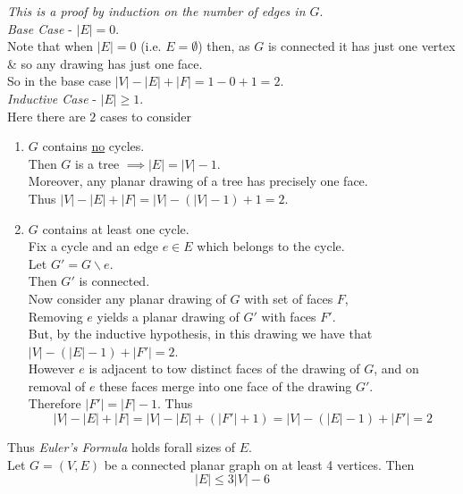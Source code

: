 \documentclass[11pt,a4paper]{article}
\begin{document}
\textit{This is a proof by induction on the number of edges in $G$}.\\
\textit{Base Case} - $|E|=0$.\\
Note that when $|E|=0$ (i.e. $E=\emptyset$) then, as $G$ is connected it has just one vertex \& so any drawing has just one face.\\
So in the base case $|V|-|E|+|F|=1-0+1=2$.\\
\textit{Inductive Case} - $|E|\geq1$.\\
Here there are $2$ cases to consider
\begin{enumerate}[label=\roman*)]
	\item $G$ contains \underline{no} cycles.\\
	Then $G$ is a tree $\implies|E|=|V|-1$.\\
	Moreover, any planar drawing of a tree has precisely one face.\\
	Thus $|V|-|E|+|F|=|V|-(|V|-1)+1=2$.
	\item $G$ contains at least one cycle.\\
	Fix a cycle and an edge $e\in E$ which belongs to the cycle.\\
	Let $G'=G\backslash e$.\\
	Then $G'$ is connected.\\
	Now consider any planar drawing of $G$ with set of faces $F$,\\
	Removing $e$ yields a planar drawing of $G'$ with faces $F'$.\\
	But, by the inductive hypothesis, in this drawing we have that $|V|-(|E|-1)+|F'|=2$.\\
	However $e$ is adjacent to tow distinct faces of the drawing of $G$, and on removal of $e$ these faces merge into one face of the drawing $G'$.\\
	Therefore $|F'|=|F|-1$. Thus
	$$|V|-|E|+|F|=|V|-|E|+(|F'|+1)=|V|-(|E|-1)+|F'|=2$$
\end{enumerate}
Thus \textit{Euler's Formula} holds forall sizes of $E$.\\

Let $G=(V,E)$ be a connected planar graph on at least 4 vertices. Then
$$|E|\leq3|V|-6$$
\end{document}
